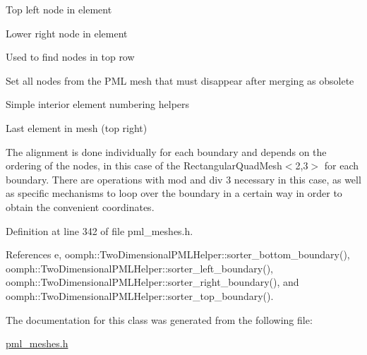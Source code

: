 Top left node in element

Lower right node in element

Used to find nodes in top row

Set all nodes from the P\+ML mesh that must disappear after merging as obsolete

Simple interior element numbering helpers

Last element in mesh (top right)

The alignment is done individually for each boundary and depends on the ordering of the nodes, in this case of the Rectangular\+Quad\+Mesh$<$2,3$>$ for each boundary. There are operations with mod and div 3 necessary in this case, as well as specific mechanisms to loop over the boundary in a certain way in order to obtain the convenient coordinates. 

Definition at line 342 of file pml\+\_\+meshes.\+h.



References e, oomph\+::\+Two\+Dimensional\+P\+M\+L\+Helper\+::sorter\+\_\+bottom\+\_\+boundary(), oomph\+::\+Two\+Dimensional\+P\+M\+L\+Helper\+::sorter\+\_\+left\+\_\+boundary(), oomph\+::\+Two\+Dimensional\+P\+M\+L\+Helper\+::sorter\+\_\+right\+\_\+boundary(), and oomph\+::\+Two\+Dimensional\+P\+M\+L\+Helper\+::sorter\+\_\+top\+\_\+boundary().



The documentation for this class was generated from the following file\+:\begin{DoxyCompactItemize}
\item 
\hyperlink{pml__meshes_8h}{pml\+\_\+meshes.\+h}\end{DoxyCompactItemize}
